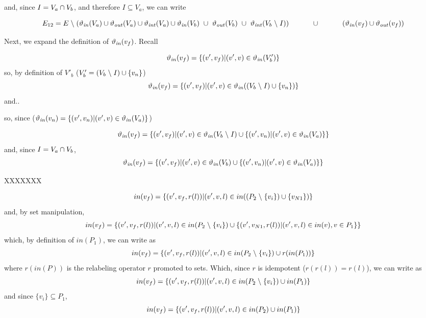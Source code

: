 \noindent
and, since $I = V_a \cap V_b$,  and therefore $I \subseteq V_a$, we can write

\[
E_{12}  = 
  E\hide(\INN(V_a) \union \OUT(V_a) \union \INT(V_a) \union    \INN(V_b) ~\union\ \OUT(V_b)   ~\union\   \INT(V_b\hide I))  \\
   \hphantom{E_{12}  = \;\; }   \union\ \\
\hphantom{E_{12}  = \;\;}   (\INN(v_f) \union \OUT(v_f))\\ 
\]





Next, we expand the definition of $\mathit{\vartheta_{in}}(v_f)$. Recall   


\[
 \mathit{\vartheta_{in}}(v_f) = \{(v',v_f)|(v',v) \in \mathit{\vartheta_{in}}(V'_b) \}\\
\]
\noindent
so, by definition of $V'_b$ ($V'_b = (V_b\mathrel{\backslash} I)\cup\{v_{n}\}$)
\[
 \mathit{\vartheta_{in}}(v_f) = \{(v',v_f)|(v',v) \in \mathit{\vartheta_{in}}((V_b\mathrel{\backslash} I)\cup\{v_{n}\}) \}\\
 \]
   and..



   so, since ($\mathit{\vartheta_{in}}(v_n) = \{(v',v_n)|(v',v) \in \mathit{\vartheta_{in}}(V_a) \}$)
   
\[
 \mathit{\vartheta_{in}}(v_f) = \{(v',v_f)|(v',v) \in \mathit{\vartheta_{in}}(V_b\mathrel{\backslash} I)\cup  \{(v',v_n)|(v',v) \in \mathit{\vartheta_{in}}(V_a) \} \}\\
\]
\noindent
and,  since $I = V_a \cap V_b$, 
\[
 \mathit{\vartheta_{in}}(v_f) = \{(v',v_f)|(v',v) \in \mathit{\vartheta_{in}}(V_b)\cup  \{(v',v_n)|(v',v) \in \mathit{\vartheta_{in}}(V_a) \} \}\\
\]

XXXXXXX

\[
in(v_f) = \{(v',v_f,r(l))|(v',v,l) \in in((P_2\mathrel{\backslash}\{v_i\}) \cup \{v_{N1}\})\}
\]
\noindent
and, by set manipulation, 
\[
in(v_f) = \{(v',v_f,r(l))|(v',v,l) \in in(P_2\mathrel{\backslash}\{v_i\}) \cup  \{(v',v_{N1},r(l))|(v',v,l)\in in(v), v\in P_1\}\}
\]
\noindent
which, by definition of $in(P_1)$, we can write as
\[
in(v_f) = \{(v',v_f,r(l))|(v',v,l) \in in(P_2\mathrel{\backslash}\{v_i\}) \cup  r(in(P_1))\}
\]
\noindent
where $r(in(P))$ is the relabeling operator $r$ promoted to sets.  Which, since $r$ is idempotent ($r(r(l)) = r(l)$), we can write as
\[
in(v_f) = \{(v',v_f,r(l))|(v',v,l) \in in(P_2\mathrel{\backslash}\{v_i\}) \cup  in(P_1)\}
\]
\noindent
and since $\{v_i\} \subseteq P_1$, 
\[
in(v_f) = \{(v',v_f,r(l))|(v',v,l) \in in(P_2) \cup  in(P_1)\}
\]

